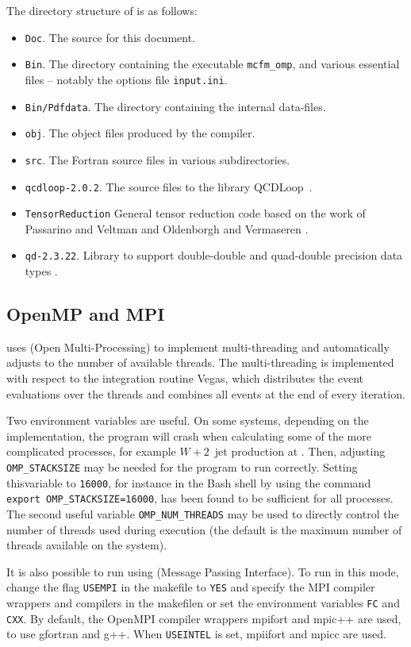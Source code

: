 The directory structure of \MCFM{} is as follows:
\begin{itemize}
\item {\tt Doc}. The source for this document.
\item {\tt Bin}. The directory containing the executable {\tt mcfm\_omp},
and various essential files -- notably the options file {\tt input.ini}.
\item {\tt Bin/Pdfdata}. The directory containing the internal \PDF{} data-files.
\item {\tt obj}. The object files produced by the compiler. 
\item {\tt src}. The Fortran source files in various subdirectories.
\item {\tt qcdloop-2.0.2}. The source files to the library QCDLoop~\cite{Carrazza:2016gav,Ellis:2007qk}.
\item {\tt TensorReduction} General tensor reduction code based on the work of Passarino and 
Veltman \cite{Passarino:1978jh} and Oldenborgh and Vermaseren \cite{vanOldenborgh:1989wn}.
\item {\tt qd-2.3.22}. Library to support double-double and quad-double precision data types \cite{libqd}.
\end{itemize}
 
\subsection{OpenMP and MPI}
\MCFM{} uses \OMP{} (Open Multi-Processing) to implement multi-threading and automatically adjusts to the 
number of available \CPU{} threads. The multi-threading is implemented with respect to the integration routine 
Vegas, which distributes the event evaluations over the threads and combines all events at the end of 
every iteration.

Two environment variables are useful. On some systems, depending on the \OMP{} implementation,
the program will crash when calculating some of the more complicated processes,
for example $W+2$~jet production at \NLO{}.
Then, adjusting {\tt OMP\_STACKSIZE} may be needed for the program to run correctly.
Setting thisvariable to {\tt 16000}, for instance in the Bash shell by using the
command {\tt export OMP\_STACKSIZE=16000}, has been found to be sufficient
for all processes.  The second useful variable {\tt OMP\_NUM\_THREADS}
may be used to directly control the number of threads used during
\OMP{} execution (the default is the maximum number of threads available
on the system).

It is also possible to run \MCFM{} using \MPI{} (Message Passing Interface).
To run in this mode, change the flag {\tt USEMPI} in the makefile to {\tt YES} and specify the MPI compiler 
wrappers and compilers in the makefilen or set the environment variables \texttt{FC} and \texttt{CXX}.
By default, the OpenMPI compiler wrappers mpifort and mpic++ are used,
to use gfortran and g++. When {\tt USEINTEL} is set, mpiifort and mpicc are used.
 